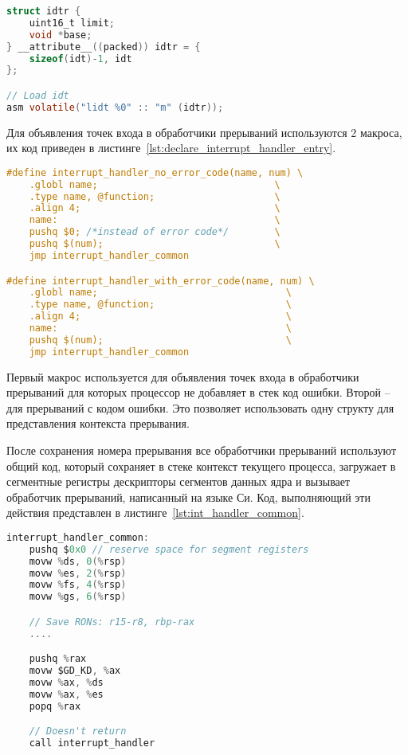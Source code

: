 \begin{lstlisting}[language=C,
caption={Загрузка IDT},
label={lst:load_idt}]
struct idtr {
	uint16_t limit;
	void *base;
} __attribute__((packed)) idtr = {
	sizeof(idt)-1, idt
};

// Load idt
asm volatile("lidt %0" :: "m" (idtr));
\end{lstlisting}

Для объявления точек входа в обработчики прерываний используются 2 макроса, их
код приведен в листинге~\ref{lst:declare_interrupt_handler_entry}.

\begin{lstlisting}[language=C,
caption={Макросы для объявления точек входа в обработчики прерываний},
label={lst:declare_interrupt_handler_entry}]
#define interrupt_handler_no_error_code(name, num) \
	.globl name;                               \
	.type name, @function;                     \
	.align 4;                                  \
	name:                                      \
	pushq $0; /*instead of error code*/        \
	pushq $(num);                              \
	jmp interrupt_handler_common

#define interrupt_handler_with_error_code(name, num) \
	.globl name;                                 \
	.type name, @function;                       \
	.align 4;                                    \
	name:                                        \
	pushq $(num);                                \
	jmp interrupt_handler_common
\end{lstlisting}

Первый макрос используется для объявления точек входа в обработчики прерываний для
которых процессор не добавляет в стек код ошибки. Второй -- для прерываний с кодом
ошибки. Это позволяет использовать одну структу для представления контекста прерывания.

После сохранения номера прерывания все обработчики прерываний используют общий код,
который сохраняет в стеке контекст текущего процесса, загружает в сегментные регистры
дескрипторы сегментов данных ядра и вызывает обработчик прерываний, написанный на
языке Си. Код, выполняющий эти действия представлен в листинге~\ref{lst:int_handler_common}.

\begin{lstlisting}[language=C,
caption={Общий код обработчиков прерываний},
label={lst:int_handler_common}]
interrupt_handler_common:
	pushq $0x0 // reserve space for segment registers
	movw %ds, 0(%rsp)
	movw %es, 2(%rsp)
	movw %fs, 4(%rsp)
	movw %gs, 6(%rsp)

	// Save RONs: r15-r8, rbp-rax
	....

	pushq %rax
	movw $GD_KD, %ax
	movw %ax, %ds
	movw %ax, %es
	popq %rax

	// Doesn't return
	call interrupt_handler
\end{lstlisting}

